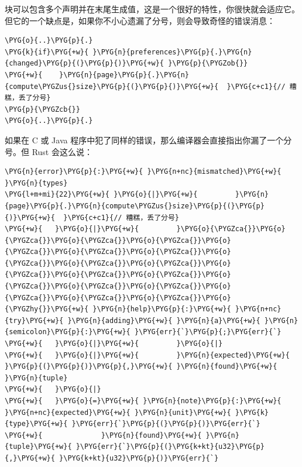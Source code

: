 块可以包含多个声明并在末尾生成值，这是一个很好的特性，你很快就会适应它。但它的一个缺点是，如果你不小心遗漏了分号，则会导致奇怪的错误消息：

\begin{Verbatim}[commandchars=\\\{\},breaklines=true,breakanywhere=true,fontsize=\codefont,xleftmargin=17bp]
\PYG{o}{..}\PYG{p}{.}
\PYG{k}{if}\PYG{+w}{ }\PYG{n}{preferences}\PYG{p}{.}\PYG{n}{changed}\PYG{p}{(}\PYG{p}{)}\PYG{+w}{ }\PYG{p}{\PYGZob{}}
\PYG{+w}{    }\PYG{n}{page}\PYG{p}{.}\PYG{n}{compute\PYGZus{}size}\PYG{p}{(}\PYG{p}{)}\PYG{+w}{  }\PYG{c+c1}{// 糟糕，丢了分号}
\PYG{p}{\PYGZcb{}}
\PYG{o}{..}\PYG{p}{.}
\end{Verbatim}

如果在 C 或 Java 程序中犯了同样的错误，那么编译器会直接指出你漏了一个分号。但 Rust 会这么说：

\begin{Verbatim}[commandchars=\\\{\},breaklines=true,breakanywhere=true,fontsize=\codefont,xleftmargin=17bp]
\PYG{n}{error}\PYG{p}{:}\PYG{+w}{ }\PYG{n+nc}{mismatched}\PYG{+w}{ }\PYG{n}{types}
\PYG{l+m+mi}{22}\PYG{+w}{ }\PYG{o}{|}\PYG{+w}{         }\PYG{n}{page}\PYG{p}{.}\PYG{n}{compute\PYGZus{}size}\PYG{p}{(}\PYG{p}{)}\PYG{+w}{  }\PYG{c+c1}{// 糟糕，丢了分号}
\PYG{+w}{   }\PYG{o}{|}\PYG{+w}{         }\PYG{o}{\PYGZca{}}\PYG{o}{\PYGZca{}}\PYG{o}{\PYGZca{}}\PYG{o}{\PYGZca{}}\PYG{o}{\PYGZca{}}\PYG{o}{\PYGZca{}}\PYG{o}{\PYGZca{}}\PYG{o}{\PYGZca{}}\PYG{o}{\PYGZca{}}\PYG{o}{\PYGZca{}}\PYG{o}{\PYGZca{}}\PYG{o}{\PYGZca{}}\PYG{o}{\PYGZca{}}\PYG{o}{\PYGZca{}}\PYG{o}{\PYGZca{}}\PYG{o}{\PYGZca{}}\PYG{o}{\PYGZca{}}\PYG{o}{\PYGZca{}}\PYG{o}{\PYGZca{}}\PYG{o}{\PYGZhy{}}\PYG{+w}{ }\PYG{n}{help}\PYG{p}{:}\PYG{+w}{ }\PYG{n+nc}{try}\PYG{+w}{ }\PYG{n}{adding}\PYG{+w}{ }\PYG{n}{a}\PYG{+w}{ }\PYG{n}{semicolon}\PYG{p}{:}\PYG{+w}{ }\PYG{err}{`}\PYG{p}{;}\PYG{err}{`}
\PYG{+w}{   }\PYG{o}{|}\PYG{+w}{         }\PYG{o}{|}
\PYG{+w}{   }\PYG{o}{|}\PYG{+w}{         }\PYG{n}{expected}\PYG{+w}{ }\PYG{p}{(}\PYG{p}{)}\PYG{p}{,}\PYG{+w}{ }\PYG{n}{found}\PYG{+w}{ }\PYG{n}{tuple}
\PYG{+w}{   }\PYG{o}{|}
\PYG{+w}{   }\PYG{o}{=}\PYG{+w}{ }\PYG{n}{note}\PYG{p}{:}\PYG{+w}{ }\PYG{n+nc}{expected}\PYG{+w}{ }\PYG{n}{unit}\PYG{+w}{ }\PYG{k}{type}\PYG{+w}{ }\PYG{err}{`}\PYG{p}{(}\PYG{p}{)}\PYG{err}{`}
\PYG{+w}{              }\PYG{n}{found}\PYG{+w}{ }\PYG{n}{tuple}\PYG{+w}{ }\PYG{err}{`}\PYG{p}{(}\PYG{k+kt}{u32}\PYG{p}{,}\PYG{+w}{ }\PYG{k+kt}{u32}\PYG{p}{)}\PYG{err}{`}
\end{Verbatim}

